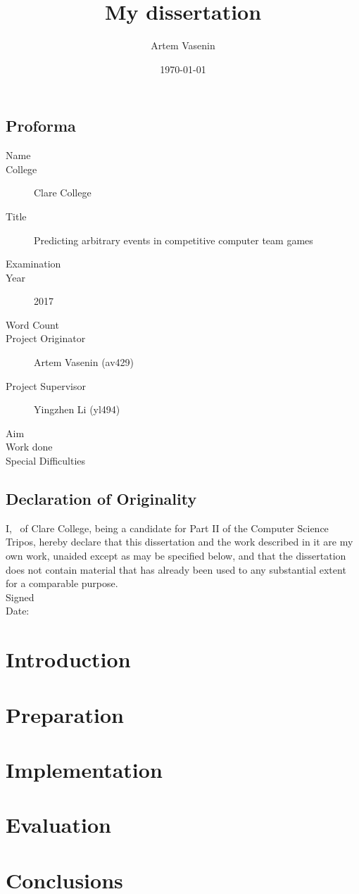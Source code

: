 \documentclass[12pt,a4paper]{report}
\title{My dissertation}
\author{Artem Vasenin}
\date{\today}
\newcommand\college{Clare College}
\begin{document}
\maketitle

\section*{Proforma}
\begin{description}
\item[Name] \theauthor
\item[College] \college
\item[Title] Predicting arbitrary events in competitive computer team games
\item[Examination] %
\item[Year] 2017
\item[Word Count] %
\item[Project Originator] Artem Vasenin (av429)
\item[Project Supervisor] Yingzhen Li (yl494)
\item[Aim] %
\item[Work done]
\item[Special Difficulties] %
\end{description}

\section*{Declaration of Originality}
I, \theauthor\ of \college, being a candidate for Part II of the Computer Science Tripos, hereby declare that this dissertation and the work described in it are my own work, unaided except as may be specified below, and that the dissertation does not contain material that has already been used to any substantial extent for a comparable purpose. %
\\[1\baselineskip]
\noindent Signed %
\\[1\baselineskip]
\noindent Date: \thedate

\clearpage
\tableofcontents

\chapter{Introduction}
\chapter{Preparation}
\chapter{Implementation}
\chapter{Evaluation}
\chapter{Conclusions}

\printbibliography
\appendix
\end{document}
